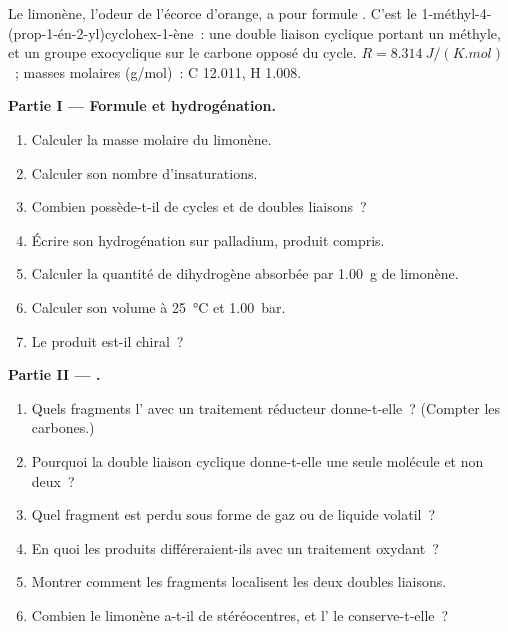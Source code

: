 \begin{problem}
\label{pb:b2:alkene-redox:1}
Le limonène, l'odeur de l'écorce d'orange, a pour formule . C'est le
1-méthyl-4-(prop-1-én-2-yl)cyclohex-1-ène~: une double liaison cyclique portant un méthyle, et un
groupe exocyclique  sur le carbone opposé du cycle. $R =
\qty{8.314}{J/(K.mol)}$~; masses molaires (\unit{g/mol})~: C 12.011, H 1.008.

\medskip
\noindent\textbf{Partie I --- Formule et hydrogénation.}
\begin{enumerate}
  \item Calculer la masse molaire du limonène.
  \item Calculer son nombre d'insaturations.
  \item Combien possède-t-il de cycles et de doubles liaisons~?
  \item Écrire son hydrogénation sur palladium, produit compris.
  \item Calculer la quantité de dihydrogène absorbée par \qty{1.00}{g} de limonène.
  \item Calculer son volume à \qty{25}{\degreeCelsius} et \qty{1.00}{bar}.
  \item Le produit est-il chiral~?
\end{enumerate}

\medskip
\noindent\textbf{Partie II --- .}
\begin{enumerate}[resume]
  \item Quels fragments l' avec un traitement réducteur donne-t-elle~? (Compter les carbones.)
  \item Pourquoi la double liaison cyclique donne-t-elle une seule molécule et non deux~?
  \item Quel fragment est perdu sous forme de gaz ou de liquide volatil~?
  \item En quoi les produits différeraient-ils avec un traitement oxydant~?
  \item Montrer comment les fragments localisent les deux doubles liaisons.
  \item Combien le limonène a-t-il de stéréocentres, et l' le conserve-t-elle~?
\end{enumerate}


\end{problem}

